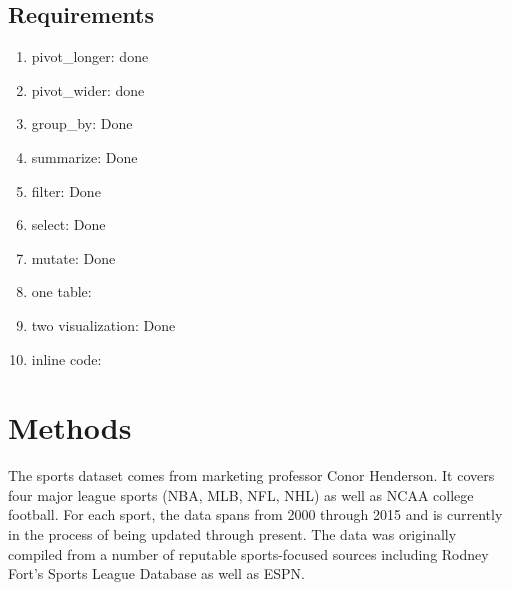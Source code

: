 \documentclass[man]{apa6}
\newenvironment{Shaded}{\begin{snugshade}}{\end{snugshade}}
\newcommand{\DataTypeTok}[1]{\textcolor[rgb]{0.13,0.29,0.53}{#1}}
\newcommand{\DecValTok}[1]{\textcolor[rgb]{0.00,0.00,0.81}{#1}}
\newcommand{\KeywordTok}[1]{\textcolor[rgb]{0.13,0.29,0.53}{\textbf{#1}}}
\newcommand{\NormalTok}[1]{#1}
\newcommand{\OperatorTok}[1]{\textcolor[rgb]{0.81,0.36,0.00}{\textbf{#1}}}
\newcommand{\StringTok}[1]{\textcolor[rgb]{0.31,0.60,0.02}{#1}}
\providecommand{\tightlist}{%
  \setlength{\itemsep}{0pt}\setlength{\parskip}{0pt}}
\begin{document}
\begin{Shaded}
\end{Shaded}

\hypertarget{requirements}{%
\subsection{Requirements}\label{requirements}}

\begin{enumerate}
\def\labelenumi{\arabic{enumi}.}
\tightlist
\item
  pivot\_longer: done
\item
  pivot\_wider: done
\item
  group\_by: Done
\item
  summarize: Done
\item
  filter: Done
\item
  select: Done
\item
  mutate: Done
\item
  one table:
\item
  two visualization: Done
\item
  inline code:
\end{enumerate}

\hypertarget{methods}{%
\section{Methods}\label{methods}}

The sports dataset comes from marketing professor Conor Henderson. It covers four major league sports (NBA, MLB, NFL, NHL) as well as NCAA college football. For each sport, the data spans from 2000 through 2015 and is currently in the process of being updated through present. The data was originally compiled from a number of reputable sports-focused sources including Rodney Fort's Sports League Database as well as ESPN.
\end{document}
